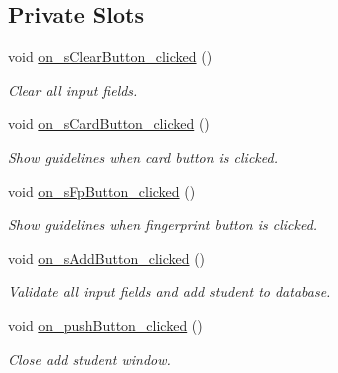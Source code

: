 \subsection*{Private Slots}
\begin{DoxyCompactItemize}
\item 
void \hyperlink{class_add_student_window_a1ae1b6d7b409187db660f128b40f9113}{on\+\_\+s\+Clear\+Button\+\_\+clicked} ()
\begin{DoxyCompactList}\small\item\em Clear all input fields. \end{DoxyCompactList}\item 
void \hyperlink{class_add_student_window_a9393f0d9cefd4b7dab0945070a454f86}{on\+\_\+s\+Card\+Button\+\_\+clicked} ()
\begin{DoxyCompactList}\small\item\em Show guidelines when card button is clicked. \end{DoxyCompactList}\item 
void \hyperlink{class_add_student_window_a7575673f89e1dc3c8c4c93cf98ea366b}{on\+\_\+s\+Fp\+Button\+\_\+clicked} ()
\begin{DoxyCompactList}\small\item\em Show guidelines when fingerprint button is clicked. \end{DoxyCompactList}\item 
void \hyperlink{class_add_student_window_ac8a09f059cf9f6e4824295dd937fdd33}{on\+\_\+s\+Add\+Button\+\_\+clicked} ()
\begin{DoxyCompactList}\small\item\em Validate all input fields and add student to database. \end{DoxyCompactList}\item 
void \hyperlink{class_add_student_window_a8a88cf8d46ed8dbef0996ab452dd862d}{on\+\_\+push\+Button\+\_\+clicked} ()
\begin{DoxyCompactList}\small\item\em Close add student window. \end{DoxyCompactList}\end{DoxyCompactItemize}
